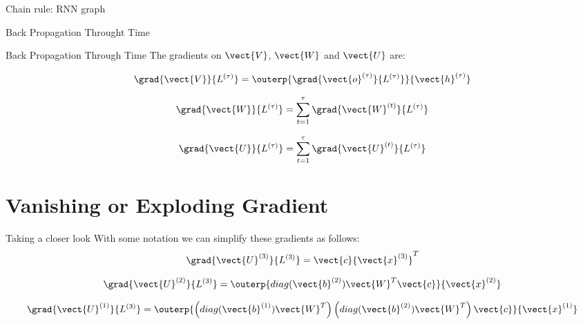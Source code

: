\documentclass[10pt]{beamer}
\begin{document}
\begin{frame}{Chain rule: RNN graph}

\end{frame}

\begin{frame}{Back Propagation Throught Time}

\end{frame}

\begin{frame}{Back Propagation Through Time}
The gradients on $\vect{V}$, $\vect{W}$ and $\vect{U}$ are:
\vspace{0.3cm}
\Large{
\begin{equation*}
\grad{\vect{V}}{L^{(\tau)}} = \outerp{\grad{\vect{o}^{(\tau)}}{L^{(\tau)}}}{\vect{h}^{(\tau)}} 
\end{equation*}


\begin{equation*}
\grad{\vect{W}}{L^{(\tau)}} = \sum_{t=1}^{\tau}\grad{\vect{W}^{(t)}}{L^{(\tau)}}
\end{equation*}

\begin{equation*}
\grad{\vect{U}}{L^{(\tau)}} = \sum_{t=1}^{\tau}\grad{\vect{U}^{(t)}}{L^{(\tau)}}
\end{equation*}
}
\end{frame}

\section{Vanishing or Exploding Gradient}


\begin{frame}{Taking a closer look}
With some notation we can simplify these gradients as follows:
\begin{eqnarray*}
\grad{\vect{U}^{(3)}}{L^{(3)}} = \vect{c}{\vect{x}^{(3)}}^{T}
\end{eqnarray*}

\begin{eqnarray*}
\grad{\vect{U}^{(2)}}{L^{(3)}} = \outerp{diag(\vect{b}^{(2)}) \vect{W}^{T} \vect{c}}{\vect{x}^{(2)}}
\end{eqnarray*}

\begin{eqnarray*}
\grad{\vect{U}^{(1)}}{L^{(3)}} = \outerp{\left(diag(\vect{b}^{(1)}) \vect{W}^{T} \right) \left(diag(\vect{b}^{(2)}) \vect{W}^{T}\right) \vect{c}}{\vect{x}^{(1)}}
\end{eqnarray*}

\end{frame}
\end{document}
